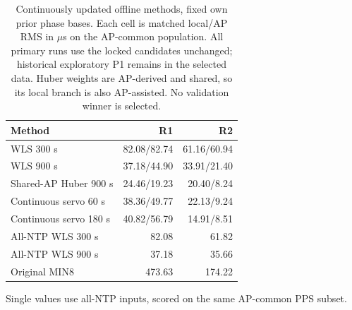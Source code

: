 
\begin{table}[t]\centering\small
\caption{Continuously updated offline methods, fixed own prior phase bases. Each cell is matched local/AP RMS in $\mu$s on the AP-common population. All primary runs use the locked candidates unchanged; historical exploratory P1 remains in the selected data. Huber weights are AP-derived and shared, so its local branch is also AP-assisted. No validation winner is selected.}
\label{tab:hybrid-filters}\begin{tabular}{lrr}\toprule
Method & R1 & R2 \\ \midrule
WLS 300 s & 82.08/82.74 & 61.16/60.94 \\
WLS 900 s & 37.18/44.90 & 33.91/21.40 \\
Shared-AP Huber 900 s & 24.46/19.23 & 20.40/8.24 \\
Continuous servo 60 s & 38.36/49.77 & 22.13/9.24 \\
Continuous servo 180 s & 40.82/56.79 & 14.91/8.51 \\
\midrule
All-NTP WLS 300 s & 82.08 & 61.82 \\
All-NTP WLS 900 s & 37.18 & 35.66 \\
Original MIN8 & 473.63 & 174.22 \\
\bottomrule\end{tabular}
\par\smallskip Single values use all-NTP inputs, scored on the same AP-common PPS subset.

\end{table}
